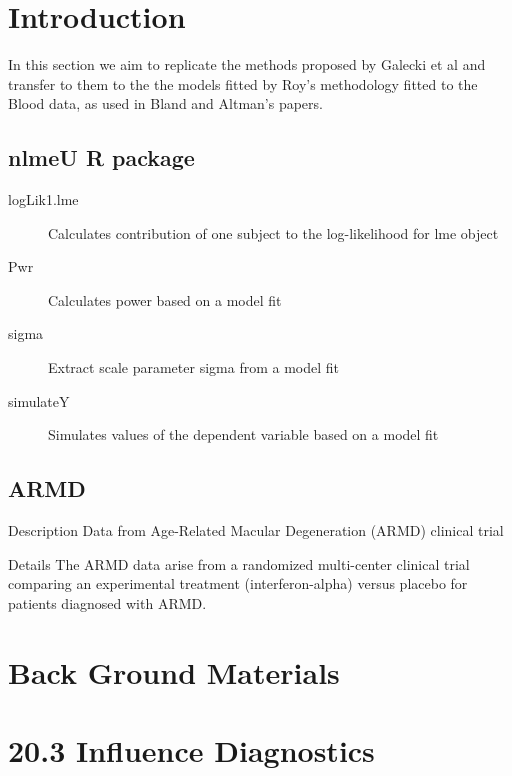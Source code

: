 \documentclass[a4paper,12pt]{article}
\begin{document}
 	\tableofcontents

\section{Introduction}
In this section we aim to replicate the methods proposed by Galecki et al and transfer to them to the
the models fitted by Roy's methodology fitted to the Blood data, as used in Bland and Altman's papers.

\subsection{nlmeU R package}

\begin{description}
\item[logLik1.lme] Calculates contribution of one subject to the log-likelihood for lme
object

\item[Pwr] Calculates power based on a model fit

\item[sigma] Extract scale parameter sigma from a model fit

\item[simulateY] Simulates values of the dependent variable based on a model fit

\end{description}

\subsection{ARMD}
Description
Data from Age-Related Macular Degeneration (ARMD) clinical trial

Details
The ARMD data arise from a randomized multi-center clinical trial comparing an experimental treatment (interferon-alpha) versus placebo for patients diagnosed with ARMD.

\section{Back Ground Materials}



\section{20.3  Influence Diagnostics}
\end{document}
